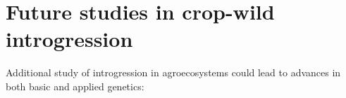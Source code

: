 \documentclass[11pt]{article}
\begin{document}
\section*{Future studies in crop-wild introgression}
Additional study of introgression in agroecosystems could lead to advances in both basic and applied genetics:
\end{document}
